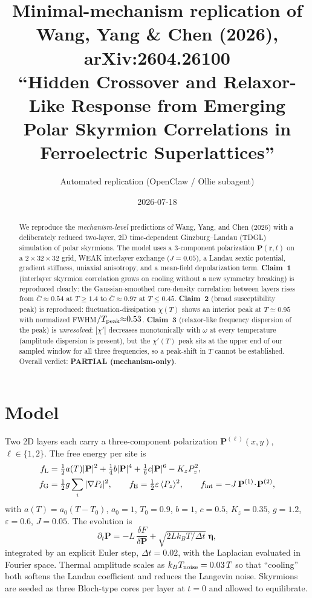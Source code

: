 \documentclass[11pt]{article}
\title{Minimal-mechanism replication of Wang, Yang \& Chen (2026),\\
       arXiv:2604.26100\\[2pt]
       \normalsize ``Hidden Crossover and Relaxor-Like Response from Emerging
       Polar Skyrmion Correlations in Ferroelectric Superlattices''}
\author{Automated replication (OpenClaw / Ollie subagent)}
\date{2026-07-18}
\begin{document}
\maketitle

\begin{abstract}
We reproduce the \emph{mechanism-level} predictions of Wang, Yang, and Chen
(2026) with a deliberately reduced two-layer, 2D time-dependent
Ginzburg--Landau (TDGL) simulation of polar skyrmions. The model uses a
$3$-component polarization $\mathbf{P}(\mathbf{r},t)$ on a
$2\times32\times32$ grid, WEAK interlayer exchange ($J{=}0.05$), a Landau
sextic potential, gradient stiffness, uniaxial anisotropy, and a mean-field
depolarization term. \textbf{Claim~1} (interlayer skyrmion correlation grows
on cooling without a new symmetry breaking) is reproduced clearly: the
Gaussian-smoothed core-density correlation between layers rises from
$\overline{C}{\approx}0.54$ at $T\ge1.4$ to
$\overline{C}{\approx}0.97$ at $T\le0.45$. \textbf{Claim~2} (broad
susceptibility peak) is reproduced: fluctuation-dissipation $\chi(T)$ shows an
interior peak at $T{\simeq}0.95$ with normalized FWHM$/T_{\rm peak}{\approx}0.53$.
\textbf{Claim~3} (relaxor-like frequency dispersion of the peak) is
\emph{unresolved}: $|\chi'|$ decreases monotonically with $\omega$ at every
temperature (amplitude dispersion is present), but the $\chi'(T)$ peak sits at
the upper end of our sampled window for all three frequencies, so a peak-shift
in $T$ cannot be established. Overall verdict:
\textbf{PARTIAL (mechanism-only)}.
\end{abstract}

\section{Model}
Two 2D layers each carry a three-component polarization
$\mathbf{P}^{(\ell)}(x,y)$, $\ell\in\{1,2\}$. The free energy per site is
\begin{align*}
 f_{\rm L} &= \tfrac{1}{2}a(T)|\mathbf{P}|^{2}
             +\tfrac{1}{4}b|\mathbf{P}|^{4}
             +\tfrac{1}{6}c|\mathbf{P}|^{6} - K_z P_z^{2},\\
 f_{\rm G} &= \tfrac{1}{2}g\sum_i|\nabla P_i|^{2},\qquad
 f_{\rm E}  = \tfrac{1}{2}\varepsilon\,\langle P_z\rangle^{2},\qquad
 f_{\rm int}= -J\,\mathbf{P}^{(1)}\!\cdot\!\mathbf{P}^{(2)},
\end{align*}
with $a(T)=a_0(T-T_0)$, $a_0{=}1$, $T_0{=}0.9$, $b{=}1$, $c{=}0.5$,
$K_z{=}0.35$, $g{=}1.2$, $\varepsilon{=}0.6$, $J{=}0.05$. The evolution is
\[
   \partial_t\mathbf{P} = -L\,\frac{\delta F}{\delta \mathbf{P}}
                         + \sqrt{2Lk_BT/\Delta t}\;\boldsymbol{\eta},
\]
integrated by an explicit Euler step, $\Delta t{=}0.02$, with the Laplacian
evaluated in Fourier space. Thermal amplitude scales as
$k_BT_{\rm noise}=0.03\,T$ so that ``cooling'' both softens the Landau
coefficient and reduces the Langevin noise. Skyrmions are seeded as three
Bloch-type cores per layer at $t{=}0$ and allowed to equilibrate.
\end{document}
